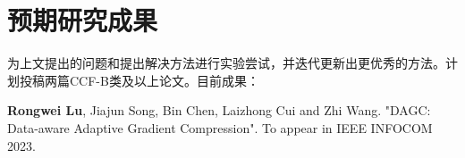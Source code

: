 
\chapter{预期研究成果}

为上文提出的问题和提出解决方法进行实验尝试，并迭代更新出更优秀的方法。计划投稿两篇CCF-B类及以上论文。目前成果：

\textbf{Rongwei Lu}, Jiajun Song, Bin Chen, Laizhong Cui and Zhi Wang. "DAGC: Data-aware Adaptive Gradient Compression". To appear in IEEE INFOCOM 2023.
